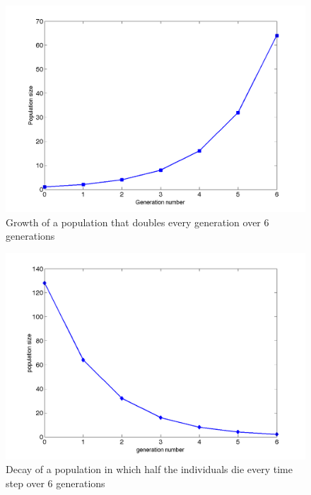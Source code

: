 \documentclass[
  letterpaper,
  DIV=11,
  numbers=noendperiod]{scrreprt}
\begin{document}
\begin{figure}

{\centering \includegraphics{./images/ch1_exp_growth.png}

}

\caption{Growth of a population that doubles every generation over 6
generations}

\end{figure}

\begin{figure}

{\centering \includegraphics{./images/ch1_exp_decay.png}

}

\caption{Decay of a population in which half the individuals die every
time step over 6 generations}

\end{figure}
\end{document}
